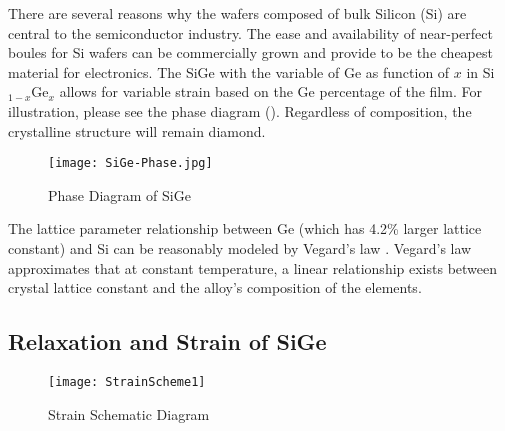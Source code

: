 There are several reasons why the wafers composed of bulk Silicon (Si) are central to the semiconductor industry.  The ease and availability of near-perfect boules for Si wafers can be commercially grown and provide to be the cheapest material for electronics.  The SiGe with the variable of Ge as function of $x$ in Si$_{1-x}$Ge$_x$ allows for variable strain based on the Ge percentage of the film.  For illustration, please see the phase diagram ().  Regardless of composition, the crystalline structure will remain diamond.
 \begin{figure}
\caption{Phase Diagram of SiGe \cite{Fig2-2}}
\label{SiGePhase}
\centering
\texttt{[image: SiGe-Phase.jpg]}
\end{figure}
 The lattice parameter relationship between Ge (which has 4.2\% larger lattice constant) and Si can be reasonably modeled by Vegard's law \cite{Denton1}.  Vegard's law approximates that at constant temperature, a linear relationship exists between crystal lattice constant and the alloy's composition of the elements.

\subsection{Relaxation and Strain of SiGe}

\begin{figure}[ht]
\caption{Strain Schematic Diagram \cite{Paul1} }
\label{StrainSch}
\begin{minipage}{\linewidth}
\texttt{[image: StrainScheme1]}
\end{minipage}
\end{figure}

